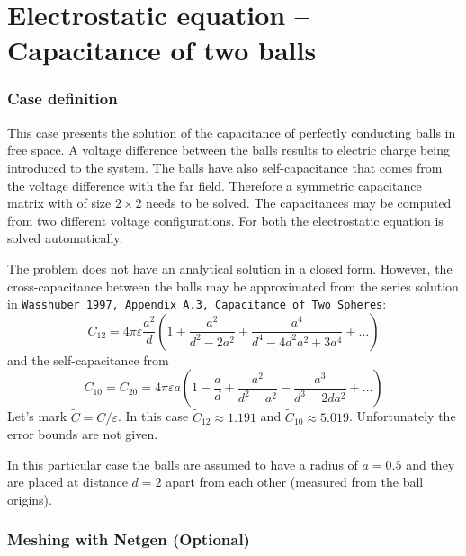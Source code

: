 \chapter{Electrostatic equation -- Capacitance of two balls}




\subsection*{Case definition}

This case presents the solution of the capacitance of perfectly conducting balls in free space. 
A voltage difference between the balls results to electric charge being introduced to the system. The balls have 
also self-capacitance that comes from the voltage difference with the far field. Therefore a symmetric capacitance matrix
with of size $2\times2$ needs to be solved.
The capacitances may be computed from two different voltage configurations.
For both the electrostatic equation is solved automatically. 

The problem does not have an analytical solution in a closed form. 
However, the cross-capacitance between the balls may be approximated from the series solution in \texttt{Wasshuber 1997, Appendix A.3, Capacitance of Two Spheres}:
\begin{equation}
C_{12} = 4 \pi \varepsilon \frac{a^2}{d}\left ( 1 + \frac{a^2}{d^2-2a^2} + \frac{a^4}{d^4-4d^2a^2 + 3a^4}+ \ldots \right )
\end{equation}
and the self-capacitance from 
\begin{equation}
C_{10} = C_{20} = 4 \pi \varepsilon a \left ( 1 - \frac{a}{d} + \frac{a^2}{d^2-a^2} - \frac{a^3}{d^3-2da^2}+ \ldots \right )
\end{equation}
Let's mark $\tilde{C} = C / \varepsilon$. In this case $\tilde{C}_{12} \approx 1.191$ and $\tilde{C}_{10} \approx 5.019$.
Unfortunately the error bounds are not given.

In this particular case 
the balls are assumed to have a radius of $a=0.5$ and they are placed at distance $d=2$ apart from 
each other (measured from the ball origins). 


\subsection*{Meshing with Netgen (Optional)}

